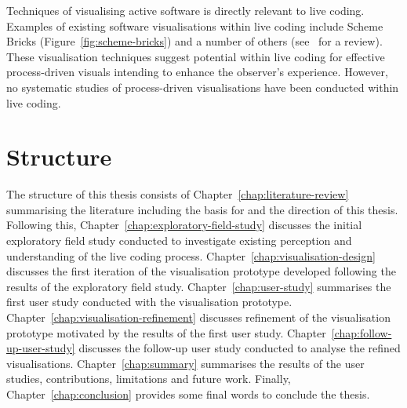 Techniques of visualising active software is directly relevant to live coding. Examples of existing software visualisations within live coding include Scheme Bricks (Figure~\ref{fig:scheme-bricks}) and a number of others (see~\cite{McLean2010a} for a review). These visualisation techniques suggest potential within live coding for effective process-driven visuals intending to enhance the observer's experience. However, no systematic studies of process-driven visualisations have been conducted within live coding.

\section{Structure}

The structure of this thesis consists of Chapter~\ref{chap:literature-review} summarising the literature including the basis for and the direction of this thesis. Following this, Chapter~\ref{chap:exploratory-field-study} discusses the initial exploratory field study conducted to investigate existing perception and understanding of the live coding process. Chapter~\ref{chap:visualisation-design} discusses the first iteration of the visualisation prototype developed following the results of the exploratory field study. Chapter~\ref{chap:user-study} summarises the first user study conducted with the visualisation prototype. Chapter~\ref{chap:visualisation-refinement} discusses refinement of the visualisation prototype motivated by the results of the first user study. Chapter~\ref{chap:follow-up-user-study} discusses the follow-up user study conducted to analyse the refined visualisations. Chapter~\ref{chap:summary} summarises the results of the user studies, contributions, limitations and future work. Finally, Chapter~\ref{chap:conclusion} provides some final words to conclude the thesis.

